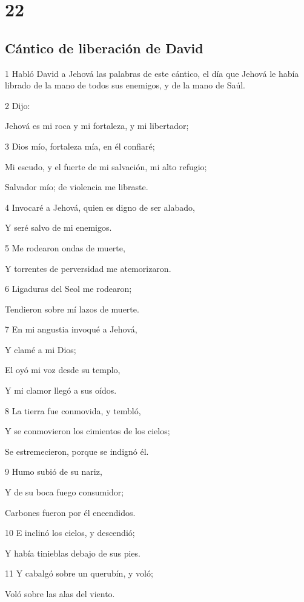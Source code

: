 \chapter{22}

\section*{Cántico de liberación de David}

\par 1 Habló David a Jehová las palabras de este cántico, el día que Jehová le había librado de la mano de todos sus enemigos, y de la mano de Saúl.
\par 2 Dijo:
\par Jehová es mi roca y mi fortaleza, y mi libertador;
\par 3 Dios mío, fortaleza mía, en él confiaré;
\par Mi escudo, y el fuerte de mi salvación, mi alto refugio;
\par Salvador mío; de violencia me libraste.
\par 4 Invocaré a Jehová, quien es digno de ser alabado,
\par Y seré salvo de mi enemigos.
\par 5 Me rodearon ondas de muerte,
\par Y torrentes de perversidad me atemorizaron.
\par 6 Ligaduras del Seol me rodearon;
\par Tendieron sobre mí lazos de muerte.
\par 7 En mi angustia invoqué a Jehová,
\par Y clamé a mi Dios;
\par El oyó mi voz desde su templo,
\par Y mi clamor llegó a sus oídos.
\par 8 La tierra fue conmovida, y tembló,
\par Y se conmovieron los cimientos de los cielos;
\par Se estremecieron, porque se indignó él.
\par 9 Humo subió de su nariz,
\par Y de su boca fuego consumidor;
\par Carbones fueron por él encendidos.
\par 10 E inclinó los cielos, y descendió;
\par Y había tinieblas debajo de sus pies.
\par 11 Y cabalgó sobre un querubín, y voló;
\par Voló sobre las alas del viento.
